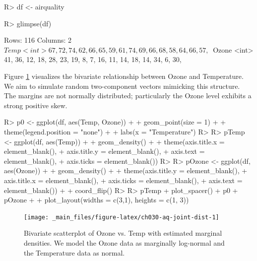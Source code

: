 \documentclass[
]{jss}
\begin{document}
\begin{CodeChunk}
\begin{CodeInput}
R> df <- airquality %
\end{CodeInput}
\end{CodeChunk}

\begin{CodeChunk}
\begin{CodeInput}
R> glimpse(df)
\end{CodeInput}
\begin{CodeOutput}
Rows: 116
Columns: 2
$ Temp  <int> 67, 72, 74, 62, 66, 65, 59, 61, 74, 69, 66, 68, 58, 64, 66, 57, ~
$ Ozone <int> 41, 36, 12, 18, 28, 23, 19, 8, 7, 16, 11, 14, 18, 14, 34, 6, 30,~
\end{CodeOutput}
\end{CodeChunk}

Figure \ref{fig:ch030-aq-joint-dist} visualizes the bivariate relationship between Ozone and Temperature. We aim to simulate random two-component vectors mimicking this structure. The margins are not normally distributed; particularly the Ozone level exhibits a strong positive skew.

\begin{CodeChunk}
\begin{CodeInput}
R> p0 <- ggplot(df, aes(Temp, Ozone)) +
+   geom_point(size = 1) +
+   theme(legend.position = "none") + 
+   labs(x = "Temperature")
R> 
R> pTemp <- ggplot(df, aes(Temp)) + 
+   geom_density() +
+   theme(axis.title.x = element_blank(),
+         axis.title.y = element_blank(),
+         axis.text = element_blank(),
+         axis.ticks = element_blank())
R> 
R> pOzone <- ggplot(df, aes(Ozone)) + 
+     geom_density() +
+   theme(axis.title.y = element_blank(),
+         axis.title.x = element_blank(),
+         axis.ticks = element_blank(),
+         axis.text = element_blank()) +
+   coord_flip()
R> 
R> pTemp + plot_spacer() + p0 + pOzone + 
+   plot_layout(widths = c(3,1), heights = c(1, 3)) 
\end{CodeInput}
\begin{figure}

{\centering \texttt{[image: \_main\_files/figure-latex/ch030-aq-joint-dist-1]} 

}

\caption[Bivariate scatterplot of Ozone vs]{Bivariate scatterplot of Ozone vs. Temp with estimated marginal densities. We model the Ozone data as marginally log-normal and the Temperature data as normal.}\label{fig:ch030-aq-joint-dist}
\end{figure}
\end{CodeChunk}
\end{document}

